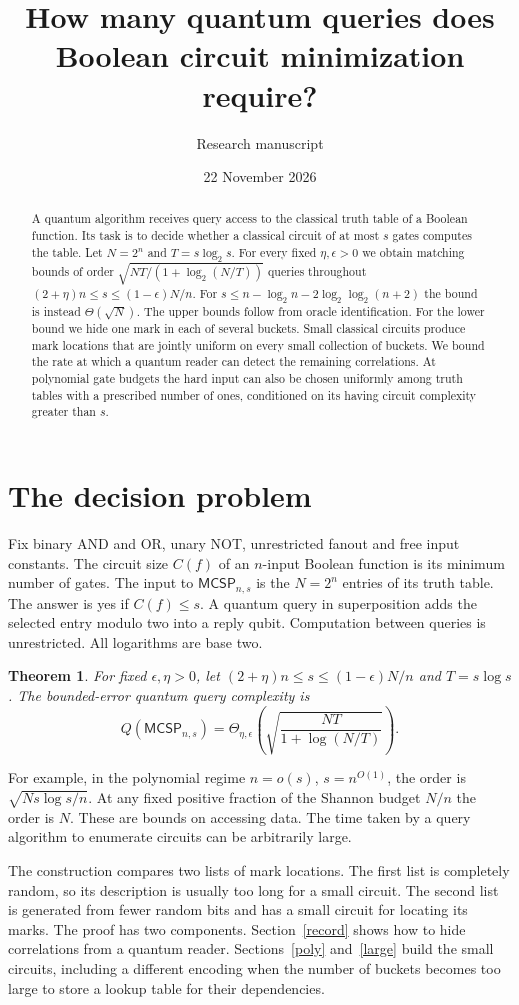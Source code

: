 \documentclass[11pt]{article}
\title{How many quantum queries does Boolean circuit minimization require?}
\author{Research manuscript}\date{22 November 2026}
\newtheorem{theorem}{Theorem}\newtheorem{lemma}[theorem]{Lemma}\newtheorem{corollary}[theorem]{Corollary}
\newcommand{\mc}{\mathsf{MCSP}}\newcommand{\F}{\mathbb F_2}\newcommand{\E}{\mathbb E}
\begin{document}
\maketitle
\begin{abstract}
A quantum algorithm receives query access to the classical truth table of a Boolean function. Its task is to decide whether a classical circuit of at most $s$ gates computes the table. Let $N=2^n$ and $T=s\log_2s$. For every fixed $\eta,\epsilon>0$ we obtain matching bounds of order $\sqrt{NT/(1+\log_2(N/T))}$ queries throughout $(2+\eta)n\le s\le(1-\epsilon)N/n$. For $s\le n-\log_2 n-2\log_2\log_2(n+2)$ the bound is instead $\Theta(\sqrt N)$. The upper bounds follow from oracle identification. For the lower bound we hide one mark in each of several buckets. Small classical circuits produce mark locations that are jointly uniform on every small collection of buckets. We bound the rate at which a quantum reader can detect the remaining correlations. At polynomial gate budgets the hard input can also be chosen uniformly among truth tables with a prescribed number of ones, conditioned on its having circuit complexity greater than $s$.
\end{abstract}
\section{The decision problem}
Fix binary AND and OR, unary NOT, unrestricted fanout and free input constants. The circuit size $C(f)$ of an $n$-input Boolean function is its minimum number of gates. The input to $\mc_{n,s}$ is the $N=2^n$ entries of its truth table. The answer is yes if $C(f)\le s$. A quantum query in superposition adds the selected entry modulo two into a reply qubit. Computation between queries is unrestricted. All logarithms are base two.
\begin{theorem}\label{main}
For fixed $\epsilon,\eta>0$, let $(2+\eta)n\le s\le(1-\epsilon)N/n$ and $T=s\log s$. The bounded-error quantum query complexity is
\[
 Q(\mc_{n,s})=\Theta_{\eta,\epsilon}\!\left(\sqrt{\frac{NT}{1+\log(N/T)}}\right).
\]
\end{theorem}
For example, in the polynomial regime $n=o(s)$, $s=n^{O(1)}$, the order is $\sqrt{Ns\log s/n}$. At any fixed positive fraction of the Shannon budget $N/n$ the order is $N$. These are bounds on accessing data. The time taken by a query algorithm to enumerate circuits can be arbitrarily large.

The construction compares two lists of mark locations. The first list is completely random, so its description is usually too long for a small circuit. The second list is generated from fewer random bits and has a small circuit for locating its marks. The proof has two components. Section~\ref{record} shows how to hide correlations from a quantum reader. Sections~\ref{poly} and~\ref{large} build the small circuits, including a different encoding when the number of buckets becomes too large to store a lookup table for their dependencies.
\end{document}
